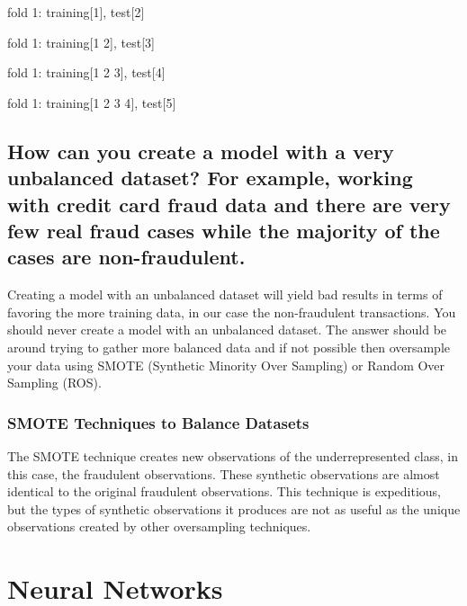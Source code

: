 \documentclass[
]{book}
\begin{document}
fold 1: training{[}1{]}, test{[}2{]}

fold 1: training{[}1 2{]}, test{[}3{]}

fold 1: training{[}1 2 3{]}, test{[}4{]}

fold 1: training{[}1 2 3 4{]}, test{[}5{]}

\hypertarget{how-can-you-create-a-model-with-a-very-unbalanced-dataset-for-example-working-with-credit-card-fraud-data-and-there-are-very-few-real-fraud-cases-while-the-majority-of-the-cases-are-non-fraudulent.}{%
\section{How can you create a model with a very unbalanced dataset? For example, working with credit card fraud data and there are very few real fraud cases while the majority of the cases are non-fraudulent.}\label{how-can-you-create-a-model-with-a-very-unbalanced-dataset-for-example-working-with-credit-card-fraud-data-and-there-are-very-few-real-fraud-cases-while-the-majority-of-the-cases-are-non-fraudulent.}}

Creating a model with an unbalanced dataset will yield bad results in terms of favoring the more training data, in our case the non-fraudulent transactions. You should never create a model with an unbalanced dataset. The answer should be around trying to gather more balanced data and if not possible then oversample your data using SMOTE (Synthetic Minority Over Sampling) or Random Over Sampling (ROS).

\hypertarget{smote-techniques-to-balance-datasets}{%
\subsection{SMOTE Techniques to Balance Datasets}\label{smote-techniques-to-balance-datasets}}

The SMOTE technique creates new observations of the underrepresented class, in this case, the fraudulent observations. These synthetic observations are almost identical to the original fraudulent observations. This technique is expeditious, but the types of synthetic observations it produces are not as useful as the unique observations created by other oversampling techniques.

\hypertarget{neural-networks-1}{%
\chapter{Neural Networks}\label{neural-networks-1}}
\end{document}
